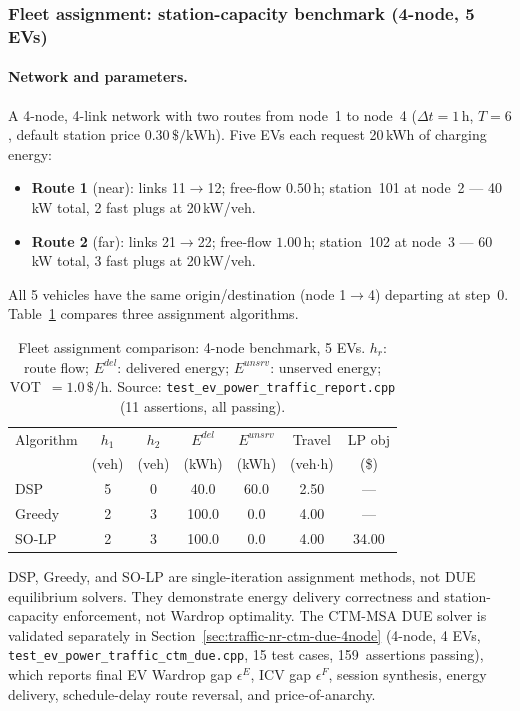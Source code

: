 \subsubsection{Fleet assignment: station-capacity benchmark (4-node, 5 EVs)}
\label{sec:traffic-nr-fleet-assignment}

\paragraph{Network and parameters.}
A 4-node, 4-link network with two routes from node~1 to node~4
($\Delta t = 1\,\text{h}$, $T = 6$, default station price $0.30\,\$/\text{kWh}$).
Five EVs each request 20\,kWh of charging energy:
\begin{itemize}
  \item \textbf{Route 1} (near): links 11$\to$12; free-flow $0.50\,\text{h}$;
        station~101 at node~2 — 40\,kW total, 2 fast plugs at 20\,kW/veh.
  \item \textbf{Route 2} (far): links 21$\to$22; free-flow $1.00\,\text{h}$;
        station~102 at node~3 — 60\,kW total, 3 fast plugs at 20\,kW/veh.
\end{itemize}
All 5 vehicles have the same origin/destination (node 1$\to$4) departing at
step~0.  Table~\ref{tab:nr-fleet-assignment} compares three assignment
algorithms.

\begin{table}[htbp]
\centering
\caption{Fleet assignment comparison: 4-node benchmark, 5 EVs.
  $h_r$: route flow;
  $E^{del}$: delivered energy;
  $E^{unsrv}$: unserved energy;
  VOT~$= 1.0\,\$/\text{h}$.
  Source: \texttt{test\_ev\_power\_traffic\_report.cpp} (11 assertions, all passing).}
\label{tab:nr-fleet-assignment}
\begin{tabular}{lcccccc}
\toprule
Algorithm & $h_1$ & $h_2$ & $E^{del}$ & $E^{unsrv}$ & Travel & LP obj \\
 & (veh) & (veh) & (kWh) & (kWh) & (veh$\cdot$h) & (\$) \\
\midrule
DSP    & 5 & 0 & 40.0  & 60.0 & 2.50 & --- \\
Greedy & 2 & 3 & 100.0 & 0.0  & 4.00 & --- \\
SO-LP  & 2 & 3 & 100.0 & 0.0  & 4.00 & 34.00 \\
\bottomrule
\end{tabular}
\end{table}

\begin{remark}
  DSP, Greedy, and SO-LP are single-iteration assignment methods, not
  DUE equilibrium solvers.  They demonstrate energy delivery correctness
  and station-capacity enforcement, not Wardrop optimality.
  The CTM-MSA DUE solver is validated separately in
  Section~\ref{sec:traffic-nr-ctm-due-4node} (4-node, 4 EVs,
  \texttt{test\_ev\_power\_traffic\_ctm\_due.cpp}, 15 test cases,
  159~assertions passing), which reports final EV Wardrop gap
  $\epsilon^E$, ICV gap $\epsilon^F$, session synthesis, energy
  delivery, schedule-delay route reversal, and price-of-anarchy.
\end{remark}

